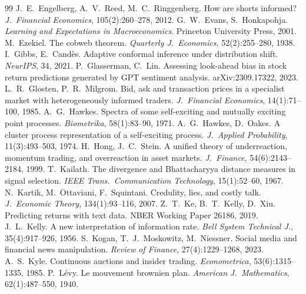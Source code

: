 \documentclass[10pt,twocolumn,letterpaper]{article}
\theoremstyle{plain}
\theoremstyle{definition}
\theoremstyle{remark}
\begin{document}
{\begin{thebibliography}{99}
 J.~E.~Engelberg, A.~V.~Reed, M.~C.~Ringgenberg. How are shorts informed? \emph{J.\ Financial Economics}, 105(2):260--278, 2012.
 G.~W.~Evans, S.~Honkapohja. \emph{Learning and Expectations in Macroeconomics}. Princeton University Press, 2001.
 M.~Ezekiel. The cobweb theorem. \emph{Quarterly J.\ Economics}, 52(2):255--280, 1938.
 I.~Gibbs, E.~Cand\`es. Adaptive conformal inference under distribution shift. \emph{NeurIPS}, 34, 2021.
 P.~Glasserman, C.~Lin. Assessing look-ahead bias in stock return predictions generated by GPT sentiment analysis. arXiv:2309.17322, 2023.
 L.~R.~Glosten, P.~R.~Milgrom. Bid, ask and transaction prices in a specialist market with heterogeneously informed traders. \emph{J.\ Financial Economics}, 14(1):71--100, 1985.
 A.~G.~Hawkes. Spectra of some self-exciting and mutually exciting point processes. \emph{Biometrika}, 58(1):83--90, 1971.
 A.~G.~Hawkes, D.~Oakes. A cluster process representation of a self-exciting process. \emph{J.\ Applied Probability}, 11(3):493--503, 1974.
 H.~Hong, J.~C.~Stein. A unified theory of underreaction, momentum trading, and overreaction in asset markets. \emph{J.\ Finance}, 54(6):2143--2184, 1999.
 T.~Kailath. The divergence and Bhattacharyya distance measures in signal selection. \emph{IEEE Trans.\ Communication Technology}, 15(1):52--60, 1967.
 N.~Kartik, M.~Ottaviani, F.~Squintani. Credulity, lies, and costly talk. \emph{J.\ Economic Theory}, 134(1):93--116, 2007.
 Z.~T.~Ke, B.~T.~Kelly, D.~Xiu. Predicting returns with text data. NBER Working Paper 26186, 2019.
 J.~L.~Kelly. A new interpretation of information rate. \emph{Bell System Technical J.}, 35(4):917--926, 1956.
 S.~Kogan, T.~J.~Moskowitz, M.~Niessner. Social media and financial news manipulation. \emph{Review of Finance}, 27(4):1229--1268, 2023.
 A.~S.~Kyle. Continuous auctions and insider trading. \emph{Econometrica}, 53(6):1315--1335, 1985.
 P.~L\'evy. Le mouvement brownien plan. \emph{American J.\ Mathematics}, 62(1):487--550, 1940.

\end{thebibliography}}
\end{document}
